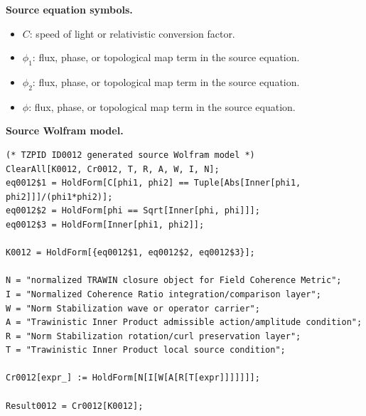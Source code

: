 \begin{minipage}[t]{0.49\linewidth}
\begingroup
\small
\raggedright
\textbf{Source equation symbols.}\par
\begin{itemize}[leftmargin=1.35em,itemsep=1pt,topsep=1pt,parsep=0pt]
    \item $C$: speed of light or relativistic conversion factor.
    \item $\phi_{1}$: flux, phase, or topological map term in the source equation.
    \item $\phi_{2}$: flux, phase, or topological map term in the source equation.
    \item $\phi$: flux, phase, or topological map term in the source equation.
\end{itemize}
\endgroup
\end{minipage}\hfill
\begin{minipage}[t]{0.47\linewidth}
\begingroup
\scriptsize
\raggedright
\textbf{Source Wolfram model.}\par
\begin{Verbatim}[fontsize=\tiny,breaklines=true,breakanywhere=true]
(* TZPID ID0012 generated source Wolfram model *)
ClearAll[K0012, Cr0012, T, R, A, W, I, N];
eq0012$1 = HoldForm[C[phi1, phi2] == Tuple[Abs[Inner[phi1, phi2]]]/(phi1*phi2)];
eq0012$2 = HoldForm[phi == Sqrt[Inner[phi, phi]]];
eq0012$3 = HoldForm[Inner[phi1, phi2]];

K0012 = HoldForm[{eq0012$1, eq0012$2, eq0012$3}];

N = "normalized TRAWIN closure object for Field Coherence Metric";
I = "Normalized Coherence Ratio integration/comparison layer";
W = "Norm Stabilization wave or operator carrier";
A = "Trawinistic Inner Product admissible action/amplitude condition";
R = "Norm Stabilization rotation/curl preservation layer";
T = "Trawinistic Inner Product local source condition";

Cr0012[expr_] := HoldForm[N[I[W[A[R[T[expr]]]]]]];

Result0012 = Cr0012[K0012];
\end{Verbatim}
\endgroup
\end{minipage}

